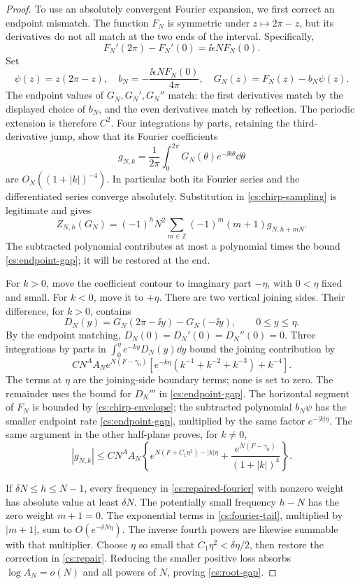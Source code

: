 \begin{proof}
To use an absolutely convergent Fourier expansion, we first correct
an endpoint mismatch. The function $F_N$ is symmetric under \(z\mapsto2\pi-z\), but
its derivatives do not all match at the two ends of the interval.
Specifically,
\[
 F_N'(2\pi)-F_N'(0)=\ii\epsilon N F_N(0).
\]
Set
\begin{equation}\label{cs:repair}
 \psi(z)=z(2\pi-z),\quad
 b_N=-\frac{\ii\epsilon N F_N(0)}{4\pi},\quad
 G_N(z)=F_N(z)-b_N\psi(z).
\end{equation}
The endpoint values of \(G_N,G_N',G_N''\) match: the first derivatives
match by the displayed choice of \(b_N\), and the even derivatives
match by reflection. The periodic extension is therefore \(C^2\).
Four integrations by parts, retaining the third-derivative jump, show
that its Fourier coefficients
\[
 g_{N,k}=\frac1{2\pi}\int_0^{2\pi}G_N(\theta)e^{-\ii k\theta}\dd\theta
\]
are \(O_N((1+|k|)^{-4})\). In particular both its Fourier series and
the differentiated series converge absolutely. Substitution in
\eqref{cs:chirp-sampling} is legitimate and gives
\begin{equation}\label{cs:repaired-fourier}
 Z_{N,h}(G_N)=(-1)^hN^2
           \sum_{m\in\mathbb Z}(-1)^m(m+1)g_{N,h+mN}.
\end{equation}
The subtracted polynomial contributes at most a polynomial times the bound
\eqref{cs:endpoint-gap}; it will be restored at the end.

For \(k>0\), move the coefficient contour to imaginary part
\(-\eta\), with \(0<\eta\) fixed and small. For \(k<0\), move it
to \(+\eta\). There are two vertical joining sides. Their difference,
for \(k>0\), contains
\[
 D_N(y)=G_N(2\pi-\ii y)-G_N(-\ii y),\qquad 0\le y\le\eta.
\]
By the endpoint matching, \(D_N(0)=D_N'(0)=D_N''(0)=0\).
Three integrations by parts in
\(\int_0^\eta e^{-ky}D_N(y)\dd y\) bound the joining contribution by
\[
 CN^A A_N e^{N(F-\gamma_0)}
 \left[e^{-k\eta}(k^{-1}+k^{-2}+k^{-3})+k^{-4}\right].
\]
The terms at \(\eta\) are the joining-side boundary terms; none is
set to zero. The remainder uses the bound for \(D_N'''\) in
\eqref{cs:endpoint-gap}. The horizontal segment of \(F_N\) is bounded by
\eqref{cs:chirp-envelope}; the subtracted polynomial \(b_N\psi\)
has the smaller endpoint rate \eqref{cs:endpoint-gap}, multiplied
by the same factor \(e^{-|k|\eta}\). The same argument in the other half-plane
proves, for \(k\ne0\),
\begin{equation}\label{cs:fourier-tail}
 |g_{N,k}|\le CN^A A_N\left\{
  e^{N(F+C_1\eta^2)-|k|\eta}
       +\frac{e^{N(F-\gamma_0)}}{(1+|k|)^4}\right\}.
\end{equation}

If \(\delta N\le h\le N-1\), every frequency in
\eqref{cs:repaired-fourier} with nonzero weight has absolute value
at least \(\delta N\). The potentially small frequency \(h-N\)
has the zero weight \(m+1=0\). The exponential terms in
\eqref{cs:fourier-tail}, multiplied by \(|m+1|\), sum to
\(O(e^{-\delta N\eta})\). The inverse fourth powers are likewise
summable with that multiplier. Choose \(\eta\) so small that
\(C_1\eta^2<\delta\eta/2\), then restore the correction in
\eqref{cs:repair}. Reducing the smaller positive loss absorbs
\(\log A_N=o(N)\) and all powers of \(N\), proving
\eqref{cs:root-gap}.
\end{proof}
